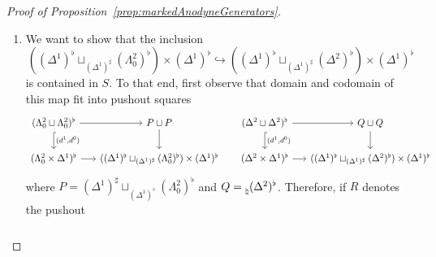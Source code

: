 \documentclass[reqno]{amsart}
\numberwithin{equation}{subsection}
\theoremstyle{plain}
\theoremstyle{definition}
\let\into=\hookrightarrow
\begin{document}
\begin{proof}[{Proof of Proposition~\ref{prop:markedAnodyneGenerators}}]
\begin{enumerate}[resume]
	\begin{equation*}
	\begin{tikzcd}
	(\Delta^1\sqcup\Delta^1)^\flat\arrow[r]\arrow[d] & K\times(\Delta^1)^\flat\arrow[d] \arrow[r] & (\Delta^1\times\Delta^1)^\flat\arrow[d]\\
	(\Delta^1\sqcup\Delta^1)^\sharp\arrow[r] & K\times(\Delta^1)^\sharp\arrow[r] & (\Delta^1)^\flat\times(\Delta^1)^\sharp
	\end{tikzcd}
	\end{equation*}
	in which the two horizontal maps on the left are induced by the inclusion of the two points of $K_0$. Using Lemma~\ref{lem:pushoutProductEquivalenceMarked}, one finds that the composite square is cocartesian, and the fact that the two horizontal maps on the left induce an equivalence when evaluated at $+\in \Delta_+$ similarly implies that the left square is a pushout too. We thus conclude that the right square is cocartesian. Thus, since the upper right horizontal morphism is contained in $S$, so is the the map $K\times(\Delta^1)^\sharp\to (\Delta^1)^\flat\times(\Delta^1)^\sharp$.
	\item We want to show that the inclusion
	\begin{equation*}
		((\Delta^1)^\flat\sqcup_{(\Delta^1)^\sharp}(\Lambda^2_0)^\flat)\times(\Delta^1)^\flat\into ((\Delta^1)^\flat\sqcup_{(\Delta^1)^\sharp}(\Delta^2)^\flat)\times(\Delta^1)^\flat
	\end{equation*}  
	is contained in $S$. To that end, first observe that domain and codomain of this map fit into pushout squares
	\begin{equation*}
	\begin{tikzcd}[column sep={11em,between origins}]
		(\Lambda^2_0\sqcup\Lambda^2_0)^\flat\arrow[r]\arrow[d, hookrightarrow, "{(d^1,d^0)}"] & P\sqcup P\arrow[d] &(\Delta^2\sqcup\Delta^2)^\flat\arrow[r]\arrow[d, hookrightarrow, "{(d^1,d^0)}"] & Q\sqcup Q\arrow[d]\\
		(\Lambda^2_0\times\Delta^1)^\flat\arrow[r] & ((\Delta^1)^\flat\sqcup_{(\Delta^1)^\sharp}(\Lambda^2_0)^\flat)\times(\Delta^1)^\flat & (\Delta^2\times\Delta^1)^\flat\arrow[r] & ((\Delta^1)^\flat\sqcup_{(\Delta^1)^\sharp}(\Delta^2)^\flat)\times(\Delta^1)^\flat
	\end{tikzcd}
	\end{equation*}
	where $P=(\Delta^1)^\sharp\sqcup_{(\Delta^1)^\flat}(\Lambda^2_0)^\flat$ and $Q=\prescript{}{\natural}(\Delta^2)^\flat$.
	Therefore, if $R$ denotes the pushout
	\begin{equation*}
	\begin{tikzcd}

\end{tikzcd}
\end{equation*}
\end{enumerate}
\end{proof}
\end{document}
